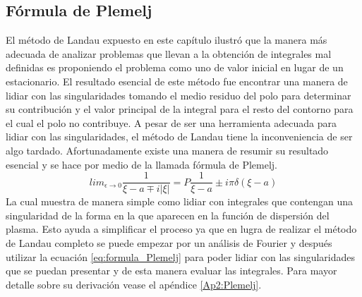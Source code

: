 \documentclass[../tesis_main_file.tex]{subfiles}
\begin{document}
\subsection{Fórmula de Plemelj}
El método de Landau expuesto en este capítulo ilustró que la manera más adecuada de analizar problemas que llevan a la obtención de integrales mal definidas es proponiendo el problema como uno de valor inicial en lugar de un estacionario.
El resultado esencial de este método fue encontrar una manera de lidiar con las singularidades tomando el medio residuo del polo para determinar su contribución y el valor principal de la integral para el resto del contorno para el cual el polo no contribuye.
A pesar de ser una herramienta adecuada para lidiar con las singularidades, el método de Landau tiene la inconveniencia de ser algo tardado. Afortunadamente existe una manera de resumir su resultado esencial y se hace por medio de la llamada fórmula de Plemelj.
\begin{equation}
\label{eq:formula_Plemelj}
lim _{\epsilon \to 0}\frac{1}{\xi -a\mp i|\xi |}=P\frac{1}{\xi -a}\pm i\pi \delta (\xi -a)
\end{equation}
La cual muestra de manera simple como lidiar con integrales que contengan una singularidad de la forma en la que aparecen en la función de dispersión del plasma.
Esto ayuda a simplificar el proceso ya que en lugra de realizar el método de Landau completo se puede empezar por un análisis de Fourier y después utilizar la ecuación \ref{eq:formula_Plemelj} para poder lidiar con las singularidades que se puedan presentar y de esta manera evaluar las integrales.
Para mayor detalle sobre su derivación vease el apéndice \ref{Ap2:Plemelj}.
%
\end{document}
